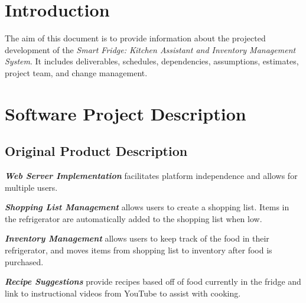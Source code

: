 \documentclass[10pt]{article}
\title{\Title}
\author{Ahmed Humayun\\ Zhen Li\\Sai Sivva\\Joshua Wilson\\Shu Yang}
\date{\today}
\begin{document}
\rmfamily
\begin{titlepage}
\maketitle
\end{titlepage}

\linespread{1.15} %




\section{Introduction}

The aim of this document is to provide information about the projected development of the \textit{Smart Fridge: Kitchen Assistant and Inventory Management System}.  It includes deliverables, schedules, dependencies, assumptions, estimates, project team, and change management.

\section{Software Project Description }
\subsection{Original Product Description}
\begin{description}
	\item {\itshape\bfseries Web Server Implementation} facilitates platform independence and allows for multiple users.
	\item {\itshape\bfseries Shopping List Management} allows users to create a shopping list. Items in the refrigerator are automatically added to the shopping list when low. 
	\item {\itshape\bfseries Inventory Management} allows users to keep track of the food in their refrigerator, and moves items from shopping list to inventory after food is purchased. 
	\item {\itshape\bfseries Recipe Suggestions} provide recipes based off of food currently in the fridge and link to instructional videos from YouTube to assist with cooking. 
\end{description}
\end{document}
